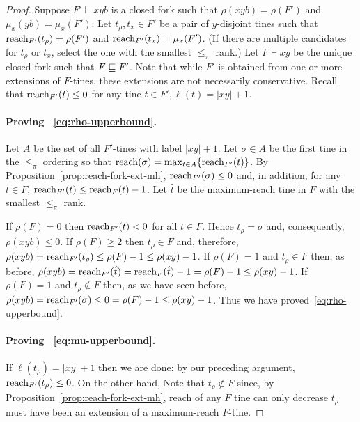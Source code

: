 \begin{proof}
  Suppose $F'\vdash xyb$ is a closed fork such that 
  $\rho(xyb)=\rho(F')$ and $\mu_x(yb)=\mu_x(F')$. 
  Let $t_\rho, t_x \in F'$ be a pair of $y$-disjoint tines such that $\operatorname{reach}_{F'}(t_\rho)=\rho(F')$ and $\operatorname{reach}_{F'}(t_x)=\mu_x(F')$. 
  (If there are multiple candidates for $t_\rho$ or $t_x$, 
  select the one with the smallest $\leq_\pi$ rank.)
  Let $F\vdash xy$ be the unique closed fork such that $F\sqsubseteq F'$.  
  Note that while $F'$ is obtained from one or more extensions 
  of $F$-tines, 
  these extensions are not necessarily conservative. 
  Recall that $\operatorname{reach}_{F'}(t) \leq 0$ for any tine $t \in F', \ell(t) = |xy| + 1$.

  \paragraph{Proving ~\eqref{eq:rho-upperbound}.} 
  Let $A$ be the set of all $F'$-tines with label $|xy| + 1$.
  Let $\sigma \in A$ be the first tine in the $\leq_\pi$ ordering so that $\operatorname{reach}(\sigma) = \max_{t \in A}\{\operatorname{reach}_{F'}(t)\}$.
  By Proposition~\ref{prop:reach-fork-ext-mh}, 
  $\operatorname{reach}_{F'}(\sigma) \leq 0$ and, 
  in addition, for any $t \in F$, 
  $\operatorname{reach}_{F'}(t) \leq \operatorname{reach}_F(t) - 1$.   
  Let $\hat{t}$ be the maximum-reach tine in $F$ 
  with the smallest $\leq_\pi$ rank.

  If $\rho(F) = 0$ then 
  $\operatorname{reach}_{F'}(t) < 0$ for all $t \in F$. 
  Hence $t_\rho = \sigma$ and, consequently, 
  $\rho(xyb) \leq 0$. 
  If $\rho(F) \geq 2$ then $t_\rho \in F$
  and, therefore, 
  $\rho(xyb) = \operatorname{reach}_{F'}(t_\rho) \leq \rho(F) - 1 \leq \rho(xy) - 1$. 
  If $\rho(F) = 1$ and $t_\rho \in F$ then, 
  as before, 
  $\rho(xyb) = \operatorname{reach}_{F'}(\hat{t}) = \operatorname{reach}_{F}(\hat{t}) - 1 = \rho(F) - 1 \leq \rho(xy) - 1$.
  If $\rho(F) = 1$ and $t_\rho \not \in F$ then, as we have seen before, 
  $\rho(xyb) = \operatorname{reach}_{F'}(\sigma) \leq 0 = \rho(F) - 1\leq \rho(xy) - 1$.
  Thus we have proved~\eqref{eq:rho-upperbound}.


  \paragraph{Proving ~\eqref{eq:mu-upperbound}.} 
  If $\ell(t_\rho) = |xy| + 1$ then we are done: 
  by our preceding argument, $\operatorname{reach}_{F'}(t_\rho) \leq 0$. 
  On the other hand, 
  Note that $t_\rho \not \in F$ since, by Proposition~\ref{prop:reach-fork-ext-mh}, reach of any $F$ tine can only decrease
  $t_\rho$ must have been an extension of a maximum-reach $F$-tine.


\end{proof}
